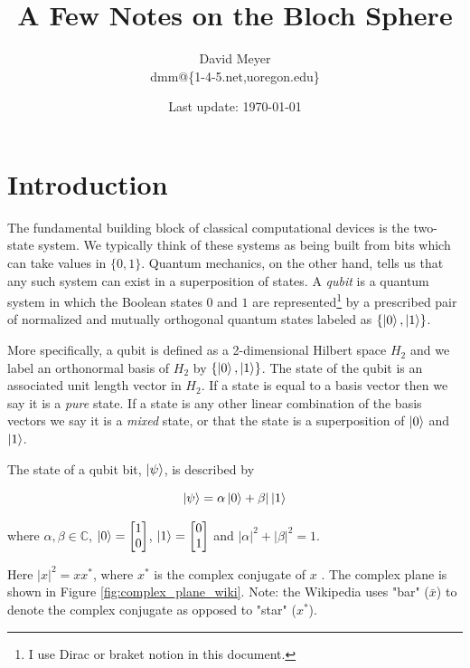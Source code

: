 \documentclass[11pt, oneside]{article}   	%
\title{A Few Notes on the Bloch Sphere}
\author{David Meyer \\ dmm@\{1-4-5.net,uoregon.edu\}}
\date{Last update: \today}							%
\begin{document}
\maketitle

\section{Introduction}
\label{sec:intro}
The fundamental building block of classical computational devices is the two-state system. We typically think of these systems as being built from bits which can take values in $\{0,1\}$.
Quantum mechanics, on the other hand, tells us that any such system can exist in a superposition of states.  A \emph{qubit} is a quantum system in which the Boolean states $0$ and $1$
 are represented\footnote{I use Dirac or braket notion \cite{wang2007} in this document.}  by a prescribed pair of normalized and mutually orthogonal quantum states labeled as $\{\ket{0},\ket{1}\}$. 
 
 \bigskip
\noindent
More specifically, a qubit is defined as a 2-dimensional 
Hilbert space $H_2$ and we label an orthonormal basis of $H_2$ by $\{\ket{0}, \ket{1}\}$. The state of the qubit is an associated unit length vector in $H_2$. If a state is equal to a basis 
vector then we say it is a \emph{pure} state. If a state is any other linear combination of the basis vectors we say it is a \emph{mixed} state, or that the state is a superposition of 
$\ket{0}$ and $\ket{1}$. 

\bigskip
\noindent
The state of a qubit bit, $\ket{\psi}$,  is described by

\begin{equation*}
\ket{\psi}   = \alpha \ket{0} + \beta | \ket{1}
\end{equation*}

\bigskip
\noindent
where $\alpha, \beta \in \mathbb{C}$, $\ket{0} =  \begin{bmatrix} 1 \\ 0 \end{bmatrix}$, $\ket{1}  = \begin{bmatrix} 0 \\ 1 \end{bmatrix}$ and 
$|\alpha|^2 + |\beta|^2 = 1$.


\bigskip
\noindent
Here  $|x|^2 = xx^*$,  where  $x^*$ is the complex conjugate of $x$ \cite{wiki:complex_conjugate}. The complex plane is shown in
Figure \ref{fig:complex_plane_wiki}. Note: the Wikipedia uses "bar" ($\bar{x}$) to denote the complex conjugate as opposed to "star" ($x^*$).
\end{document}
